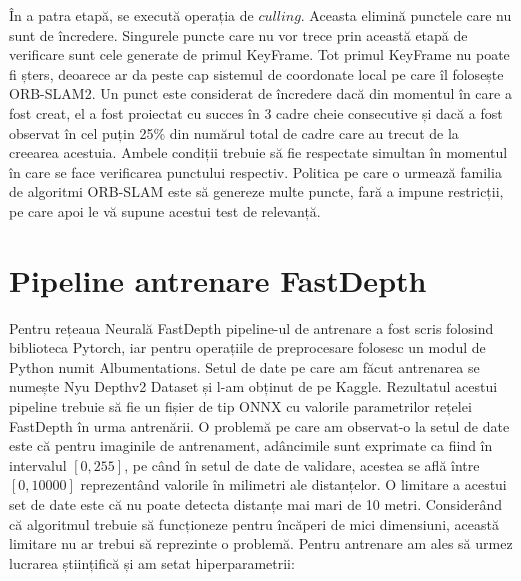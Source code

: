 \documentclass[12pt,a4paper]{report}
\begin{document}
În a patra etapă, se execută operația de $ culling $. Aceasta elimină punctele care nu sunt
de încredere. Singurele puncte care nu vor trece prin această etapă de verificare sunt
cele generate de primul KeyFrame. Tot primul KeyFrame nu poate fi șters, deoarece 
ar da peste cap sistemul de coordonate local pe care îl folosește ORB-SLAM2. Un punct 
este considerat de încredere dacă din momentul în care a fost creat, el a fost proiectat cu succes  
 în 3 cadre cheie consecutive și dacă a fost observat în cel puțin 25\% din 
numărul total de cadre care au trecut de la creearea acestuia. Ambele condiții 
trebuie să fie respectate simultan în momentul în care se face verificarea punctului
respectiv. Politica pe care o urmează familia de algoritmi ORB-SLAM este să genereze 
multe puncte, fară a impune restricții, pe care apoi le vă supune acestui test de 
relevanță. \\

\section{Pipeline antrenare FastDepth}
Pentru rețeaua Neurală FastDepth pipeline-ul de antrenare a fost scris folosind biblioteca Pytorch,
iar pentru operațiile de preprocesare folosesc un modul de Python numit Albumentations. Setul de date pe care
am făcut antrenarea se numește Nyu Depthv2 Dataset\cite{nyudataset} și l-am obținut de pe Kaggle. Rezultatul
acestui pipeline trebuie să fie un fișier de tip ONNX cu valorile parametrilor rețelei FastDepth
în urma antrenării. O problemă pe care am observat-o la setul de date este că
pentru imaginile de antrenament, adâncimile sunt exprimate ca fiind în intervalul $ [0, 255] $, pe când în setul
de date de validare, acestea se află între $ [0, 10000] $ reprezentând valorile în milimetri ale
distanțelor. O limitare a acestui set de date este că nu poate detecta distanțe mai mari de 10 metri.
Considerând că algoritmul trebuie să funcționeze pentru încăperi de mici dimensiuni, această limitare nu ar
trebui să reprezinte o problemă. Pentru antrenare am ales să urmez lucrarea științifică\cite{fastdepth} și am
setat hiperparametrii:
\end{document}
